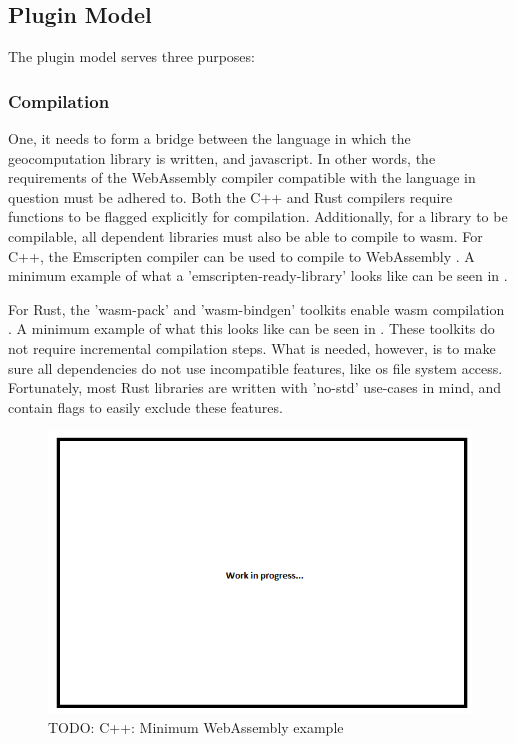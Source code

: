 \subsection{Plugin Model}

The plugin model serves three purposes:

\subsubsection{Compilation}

One, it needs to form a bridge between the language in which the geocomputation library is written, and javascript. 
In other words, the requirements of the WebAssembly compiler compatible with the language in question must be adhered to. 
Both the C++ and Rust compilers require functions to be flagged explicitly for compilation. 
Additionally, for a library to be compilable, all dependent libraries must also be able to compile to wasm.
For C++, the Emscripten compiler can be used to compile to WebAssembly \citep*{emscripten_organization_emscripten_2022}. 
A minimum example of what a 'emscripten-ready-library' looks like can be seen in .

For Rust, the 'wasm-pack' and 'wasm-bindgen' toolkits enable \ac{wasm} compilation \citep{contributors_wasm-bindgen_2022,contributors_wasm-pack_2022}.
A minimum example of what this looks like can be seen in .
These toolkits do not require incremental compilation steps.
What is needed, however, is to make sure all dependencies do not use incompatible features, like os file system access. 
Fortunately, most Rust libraries are written with 'no-std' use-cases in mind, and contain flags to easily exclude these features. 

\begin{figure}
  \centering
  \graphicspath{ {../../assets/images/misc/} }
  \includegraphics[width=\linewidth]{placeholder.png}
  \caption{TODO:  C++: Minimum WebAssembly example}
  \label{fig:minimum-cpp-wasm}
\end{figure}


